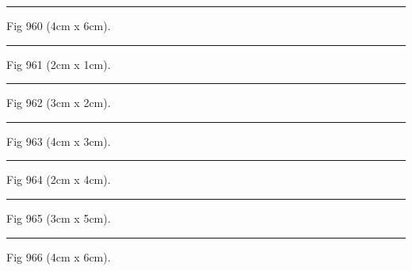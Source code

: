 \documentclass[a4paper,11pt]{article}
\begin{document}
\begin{swarmwrap}%
  \begin{minipage}[t]{4cm}
    \centering
    \rule{\linewidth}{6cm}
    {\footnotesize Fig 960 (4cm x 6cm).}
  \end{minipage}%
\end{swarmwrap}%
\swarmwrapnext
\lipsum[60]%

\begin{swarmwrap}%
  \begin{minipage}[t]{2cm}
    \centering
    \rule{\linewidth}{1cm}
    {\footnotesize Fig 961 (2cm x 1cm).}
  \end{minipage}%
\end{swarmwrap}%
\swarmwrapnext
\lipsum[61]%

\begin{swarmwrap}%
  \begin{minipage}[t]{3cm}
    \centering
    \rule{\linewidth}{2cm}
    {\footnotesize Fig 962 (3cm x 2cm).}
  \end{minipage}%
\end{swarmwrap}%
\swarmwrapnext
\lipsum[62]%

\begin{swarmwrap}%
  \begin{minipage}[t]{4cm}
    \centering
    \rule{\linewidth}{3cm}
    {\footnotesize Fig 963 (4cm x 3cm).}
  \end{minipage}%
\end{swarmwrap}%
\swarmwrapnext
\lipsum[63]%

\begin{swarmwrap}%
  \begin{minipage}[t]{2cm}
    \centering
    \rule{\linewidth}{4cm}
    {\footnotesize Fig 964 (2cm x 4cm).}
  \end{minipage}%
\end{swarmwrap}%
\swarmwrapnext
\lipsum[64]%

\begin{swarmwrap}%
  \begin{minipage}[t]{3cm}
    \centering
    \rule{\linewidth}{5cm}
    {\footnotesize Fig 965 (3cm x 5cm).}
  \end{minipage}%
\end{swarmwrap}%
\swarmwrapnext
\lipsum[65]%

\begin{swarmwrap}%
  \begin{minipage}[t]{4cm}
    \centering
    \rule{\linewidth}{6cm}
    {\footnotesize Fig 966 (4cm x 6cm).}
  \end{minipage}%
\end{swarmwrap}%
\swarmwrapnext
\lipsum[66]%
\end{document}
